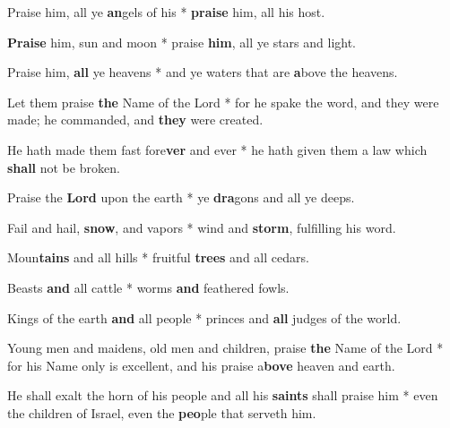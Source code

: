 \begin{multicols}{2}
	Praise him, all ye \textbf{an}gels of his * \textbf{praise} him, all his host.
	
	\textbf{Praise} him, sun and moon * praise \textbf{him}, all ye stars and light.
	
	Praise him, \textbf{all} ye heavens * and ye waters that are \textbf{a}bove the heavens.
	
	Let them praise \textbf{the} Name of the Lord * for he spake the word, and they were made; he commanded, and \textbf{they} were created.
	
	He hath made them fast fore\textbf{ver} and ever * he hath given them a law which \textbf{shall} not be broken.
	
	Praise the \textbf{Lord} upon the earth * ye \textbf{dra}gons and all ye deeps.
	
	Fail and hail, \textbf{snow}, and vapors * wind and \textbf{storm}, fulfilling his word.
	
	Moun\textbf{tains} and all hills * fruitful \textbf{trees} and all cedars.
	
	Beasts \textbf{and} all cattle * worms \textbf{and} feathered fowls.
	
	Kings of the earth \textbf{and} all people * princes and \textbf{all} judges of the world.
	
	Young men and maidens, old men and children, praise \textbf{the} Name of the Lord * for his Name only is excellent, and his praise a\textbf{bove} heaven and earth.
	
	He shall exalt the horn of his people and all his \textbf{saints} shall praise him * even the children of Israel, even the \textbf{peo}ple that serveth him.
\end{multicols}